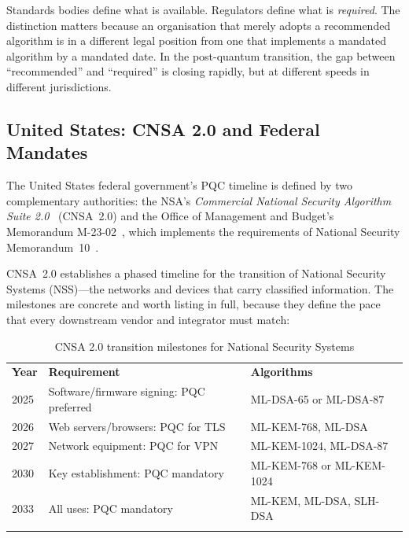 Standards bodies define what is available. Regulators define what is \emph{required}. The distinction matters because an organisation that merely adopts a recommended algorithm is in a different legal position from one that implements a mandated algorithm by a mandated date. In the post-quantum transition, the gap between ``recommended'' and ``required'' is closing rapidly, but at different speeds in different jurisdictions.

\subsection{United States: CNSA 2.0 and Federal Mandates}
\label{subsec:us-mandates}

The United States federal government's PQC timeline is defined by two complementary authorities: the NSA's \emph{Commercial National Security Algorithm Suite 2.0}~\cite{CNSA2.0} (CNSA~2.0) and the Office of Management and Budget's Memorandum M-23-02~\cite{OMB-M-23-02}, which implements the requirements of National Security Memorandum~10~\cite{NSPM-10}.

CNSA~2.0 establishes a phased timeline for the transition of National Security Systems (NSS)---the networks and devices that carry classified information. The milestones are concrete and worth listing in full, because they define the pace that every downstream vendor and integrator must match:

\begin{table}[t]
\caption{CNSA 2.0 transition milestones for National Security Systems}
\label{tab:cnsa-timeline}
\begin{tabular}{p{1.5cm}p{4cm}p{6cm}}
\hline\noalign{\smallskip}
\textbf{Year} & \textbf{Requirement} & \textbf{Algorithms} \\
\noalign{\smallskip}\svhline\noalign{\smallskip}
2025 & Software/firmware signing: PQC preferred & ML-DSA-65 or ML-DSA-87 \\
2026 & Web servers/browsers: PQC for TLS & ML-KEM-768, ML-DSA \\
2027 & Network equipment: PQC for VPN & ML-KEM-1024, ML-DSA-87 \\
2030 & Key establishment: PQC mandatory & ML-KEM-768 or ML-KEM-1024 \\
2033 & All uses: PQC mandatory & ML-KEM, ML-DSA, SLH-DSA \\
\noalign{\smallskip}\hline
\end{tabular}
\end{table}

